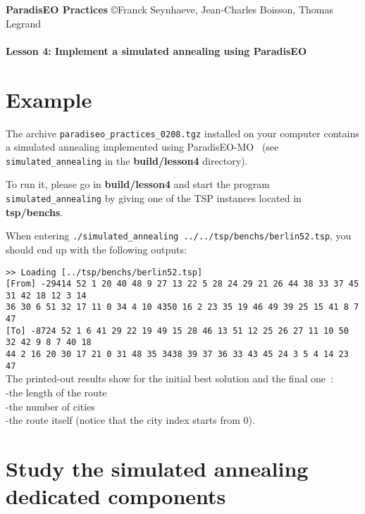 \documentclass[a4paper]{article}
\begin{document}
\textbf{ParadisEO Practices}  {\copyright Franck Seynhaeve,
Jean-Charles Boisson, Thomas Legrand} \Large{\textbf{\\\\
Lesson 4: Implement a simulated annealing using ParadisEO}}

\normalsize

\vspace{-0,3cm}

\section{Example}

    The archive {\tt paradiseo\_practices\_0208.tgz} installed
    on your computer contains a simulated annealing implemented using ParadisEO-MO~
    (see {\tt simulated\_annealing} in the {\bf build/lesson4} directory).

    \medskip
    To run it, please go in {\bf build/lesson4} and start the program {\tt simulated\_annealing} by giving
    one of the TSP instances located in {\bf tsp/benchs}.


    \medskip
    When entering {\tt ./simulated\_annealing ../../tsp/benchs/berlin52.tsp}, you should end up with the
    following outputs:

    \smallskip
    \noindent
    \texttt{>> Loading [../tsp/benchs/berlin52.tsp]}\\
    \texttt{[From] -29414  52 1 20 40 48 9 27 13 22 5 28 24 29 21 26 44 38 33 37 45 31 42 18 12 3 14}\\
    \texttt{36 30 6 51 32 17 11 0 34 4 10 4350 16 2 23 35 19 46 49 39 25 15 41 8 7 47}\\
    \texttt{[To] -8724  52 1 6 41 29 22 19 49 15 28 46 13 51 12 25 26 27 11 10 50 32 42 9 8 7 40 18}\\
    \texttt{44 2 16 20 30 17 21 0 31 48 35 3438 39 37 36 33 43 45 24 3 5 4 14 23
    47} \\

    The printed-out results show for the initial best solution and the final one~:
    \\ \hspace*{1cm}-the length of the route
    \\ \hspace*{1cm}-the number of cities
    \\ \hspace*{1cm}-the route itself (notice that the city index starts from 0).


\section{Study the simulated annealing dedicated components}
\end{document}
